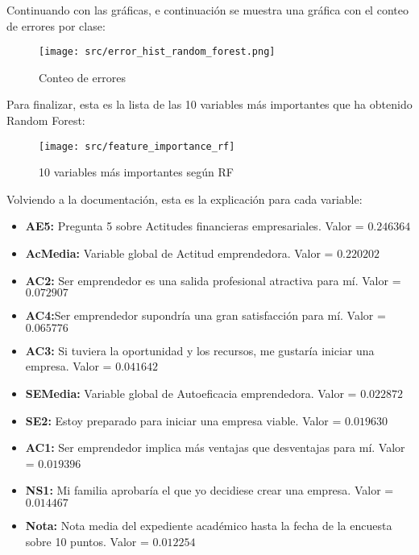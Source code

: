 Continuando con las gráficas, e continuación se muestra una gráfica con el conteo de errores por clase:
\begin{figure}[H]
	\centering
	\texttt{[image: src/error\_hist\_random\_forest.png]}
	\caption{Conteo de errores}
	\label{fig:rf_error_plot}
\end{figure}
Para finalizar, esta es la lista de las 10 variables más importantes que ha obtenido Random Forest:
\begin{figure}[H]
	\centering
	\texttt{[image: src/feature\_importance\_rf]}
	\caption{10 variables más importantes según RF}
	\label{fig:feature_rf}
\end{figure}
Volviendo a la documentación, esta es la explicación para cada variable:
\begin{itemize}
	\item\textbf{AE5:} Pregunta  5 sobre Actitudes financieras empresariales. Valor = $0.246364$
	\item\textbf{AcMedia:} Variable global de Actitud emprendedora. Valor = $0.220202$
	\item\textbf{AC2:} Ser emprendedor es una salida profesional atractiva para mí. Valor = $0.072907$
	\item\textbf{AC4:}Ser emprendedor supondría una gran satisfacción para mí. Valor = $0.065776$
	\item\textbf{AC3:} Si tuviera la oportunidad y los recursos, me gustaría iniciar una empresa. Valor = $0.041642$
	\item\textbf{SEMedia:} Variable global de Autoeficacia emprendedora. Valor = $0.022872$
	\item\textbf{SE2:} Estoy preparado para iniciar una empresa viable. Valor = $0.019630$
	\item\textbf{AC1:} Ser emprendedor implica más ventajas que desventajas para mí. Valor = $0.019396$
	\item\textbf{NS1:} Mi familia aprobaría el que yo decidiese crear una empresa. Valor = $0.014467$
	\item\textbf{Nota:} Nota media del expediente académico hasta la fecha de la encuesta sobre 10 puntos. Valor = $0.012254$
\end{itemize}

